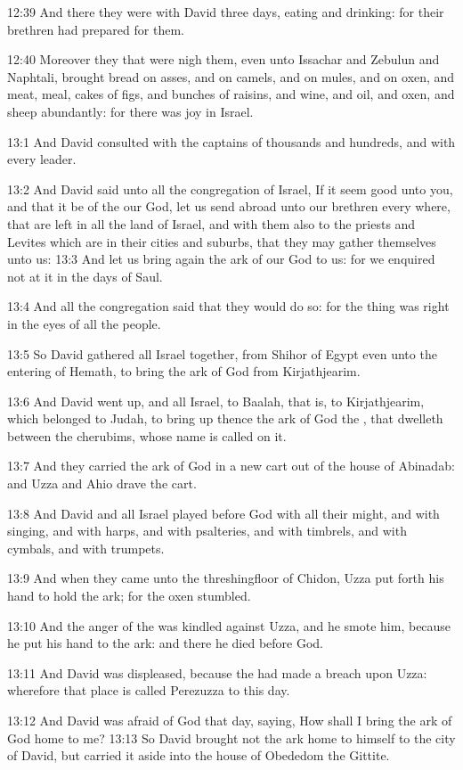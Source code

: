 12:39 And there they were with David three days, eating and drinking: for their brethren had prepared for them.

12:40 Moreover they that were nigh them, even unto Issachar and Zebulun and Naphtali, brought bread on asses, and on camels, and on mules, and on oxen, and meat, meal, cakes of figs, and bunches of raisins, and wine, and oil, and oxen, and sheep abundantly: for there was joy in Israel.

13:1 And David consulted with the captains of thousands and hundreds, and with every leader.

13:2 And David said unto all the congregation of Israel, If it seem good unto you, and that it be of the \LORD our God, let us send abroad unto our brethren every where, that are left in all the land of Israel, and with them also to the priests and Levites which are in their cities and suburbs, that they may gather themselves unto us: 13:3 And let us bring again the ark of our God to us: for we enquired not at it in the days of Saul.

13:4 And all the congregation said that they would do so: for the thing was right in the eyes of all the people.

13:5 So David gathered all Israel together, from Shihor of Egypt even unto the entering of Hemath, to bring the ark of God from Kirjathjearim.

13:6 And David went up, and all Israel, to Baalah, that is, to Kirjathjearim, which belonged to Judah, to bring up thence the ark of God the \LORD, that dwelleth between the cherubims, whose name is called on it.

13:7 And they carried the ark of God in a new cart out of the house of Abinadab: and Uzza and Ahio drave the cart.

13:8 And David and all Israel played before God with all their might, and with singing, and with harps, and with psalteries, and with timbrels, and with cymbals, and with trumpets.

13:9 And when they came unto the threshingfloor of Chidon, Uzza put forth his hand to hold the ark; for the oxen stumbled.

13:10 And the anger of the \LORD was kindled against Uzza, and he smote him, because he put his hand to the ark: and there he died before God.

13:11 And David was displeased, because the \LORD had made a breach upon Uzza: wherefore that place is called Perezuzza to this day.

13:12 And David was afraid of God that day, saying, How shall I bring the ark of God home to me?  13:13 So David brought not the ark home to himself to the city of David, but carried it aside into the house of Obededom the Gittite.

